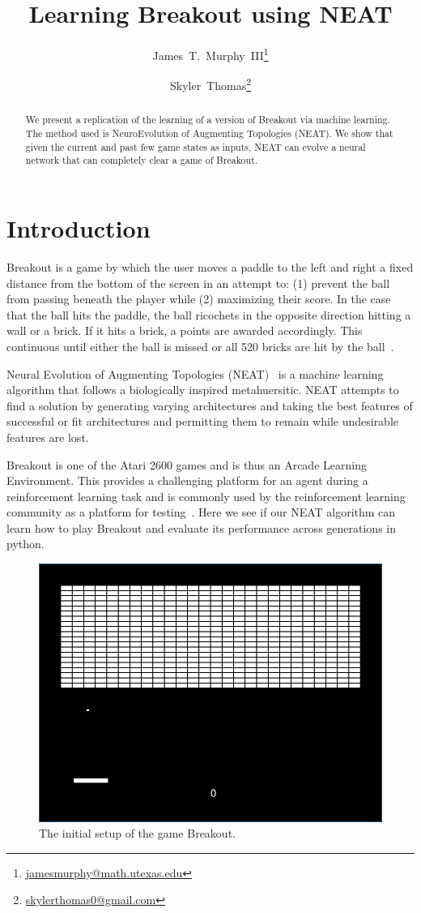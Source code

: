 \documentclass[letterpaper, twocolumn, conference]{article}
\author{James~T.~Murphy~III\thanks{\url{jamesmurphy@math.utexas.edu}}\and{}Skyler~Thomas\thanks{\url{skylerthomas0@gmail.com}}}
\title{Learning Breakout using NEAT}
\begin{document}
\maketitle{}
\begin{abstract}
    We present a replication of the learning of a version of
    Breakout via machine learning.
    The method used is NeuroEvolution of Augmenting Topologies (NEAT).
    We show that given the current and past few game states as inputs, NEAT
    can evolve a neural network that can completely clear a game of Breakout.
\end{abstract}

\section{Introduction}

Breakout is a game by which the user moves a paddle to the left and right a fixed distance from the bottom of the screen in an attempt to: (1) prevent the ball from passing beneath the player while (2) maximizing their score. In the case that the ball hits the paddle, the ball ricochets in the opposite direction hitting a wall or a brick. If it hits a brick, a points are awarded accordingly. This continuous until either the ball is missed or all 520 bricks are hit by the ball~\cite{wiki:breakout}.

Neural Evolution of Augmenting Topologies (NEAT)~\cite{neatpython} is a machine learning algorithm that follows a biologically inspired metahuersitic. NEAT attempts to find a solution by generating varying architectures and taking the best features of successful or fit architectures and permitting them to remain while undesirable features are lost.

Breakout is one of the  Atari 2600 games  and is thus an Arcade Learning Environment. This provides a challenging platform for an agent during a reinforcement learning task and is commonly used by the reinforcement learning community as a platform for testing~\cite{Machado17}. Here we see if our NEAT algorithm can learn how to play Breakout and evaluate its performance across generations in python.

\begin{figure}[h!]
    \centering
    \includegraphics[width=.45\textwidth]{breakout.png}
    \caption{The initial setup of the game Breakout.}
\end{figure}
\end{document}
